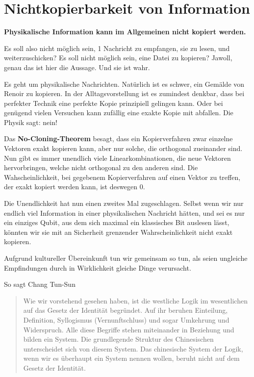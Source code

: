 \documentclass[12pt]{book}
\begin{document}
\section{Nichtkopierbarkeit von Information}

\textbf{Physikalische Information kann im Allgemeinen nicht kopiert werden.}

Es soll also nicht möglich sein, 1 Nachricht zu empfangen, sie zu lesen, und weiterzuschicken? Es soll nicht möglich sein, eine Datei zu kopieren? Jawoll, genau das ist hier die Aussage. Und sie ist wahr. 

Es geht um physikalische Nachrichten. Natürlich ist es schwer, ein Gemälde von Renoir zu kopieren. In der Alltagsvorstellung ist es zumindest denkbar, dass bei perfekter Technik eine perfekte Kopie prinzipiell gelingen kann. Oder bei genügend vielen Versuchen kann zufällig eine exakte Kopie mit abfallen. Die Physik sagt: nein!

Das \textbf{No-Cloning-Theorem} besagt, dass ein Kopierverfahren zwar einzelne Vektoren exakt kopieren kann, aber nur solche, die orthogonal zueinander sind. Nun gibt es immer unendlich viele Linearkombinationen, die neue Vektoren hervorbringen, welche nicht orthogonal zu den anderen sind. Die Wahscheinlichkeit, bei gegebenem Kopierverfahren auf einen Vektor zu treffen, der exakt kopiert werden kann, ist deswegen 0.

Die Unendlichkeit hat nun einen zweites Mal zugeschlagen. Selbst wenn wir nur endlich viel Information in einer physikalischen Nachricht hätten, und sei es nur ein einziges Qubit, aus dem sich maximal ein klassisches Bit auslesen lässt, könnten wir sie mit an Sicherheit grenzender Wahrscheinlichkeit nicht exakt kopieren. 

Aufgrund kultureller Übereinkunft tun wir gemeinsam so tun, als seien ungleiche Empfindungen durch in Wirklichkeit gleiche Dinge verursacht. 

So sagt Chang Tun-Sun

\begin{quote}\begin{tcolorbox}
Wie wir vorstehend gesehen haben, ist die westliche Logik im wesentlichen auf das Gesetz der Identität begründet. Auf ihr beruhen Einteilung, Definition, Syllogismus (Vernunftschluss) und sogar Umkehrung und Widerspruch. Alle diese Begriffe stehen miteinander in Beziehung und bilden ein System.
Die grundlegende Struktur des Chinesischen unterscheidet sich von diesem System. Das chinesische System der Logik, wenn wir es überhaupt ein System nennen wollen, beruht nicht auf dem Gesetz der Identität.
\end{tcolorbox}\end{quote}
\end{document}
